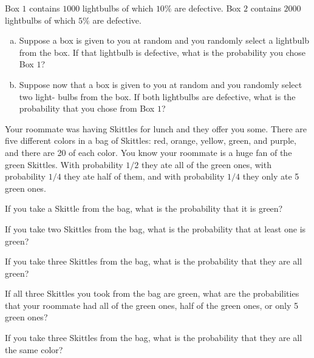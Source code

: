 
Box $1$ contains $1000$ lightbulbs of which $10 \%$ are defective. Box $2$ contains $2000$ lightbulbs of which $5 \%$ are defective.

\begin{enumerate}[(a)]


\item Suppose a box is given to you at random and you randomly select a lightbulb from the box. If that lightbulb is defective, what is the probability you chose Box $1$?

\item Suppose now that a box is given to you at random and you randomly select two light- bulbs from the box. If both lightbulbs are defective, what is the probability that you chose from Box $1$?


\end{enumerate}



 


Your roommate was having Skittles for lunch and they offer you some.
There are five different colors in a bag of Skittles: red, orange, yellow, green, and purple, and there are 20 of each color.
You know your roommate is a huge fan of the green Skittles.
With probability $1/2$ they ate all of the green ones, with probability $1/4$ they ate half of them, and with probability $1/4$ they only ate 5 green ones. 

\begin{Parts}

\Part If you take a Skittle from the bag, what is the probability that it is green? 

\Part If you take two Skittles from the bag, what is the probability that at least one is green?

\Part If you take three Skittles from the bag, what is the probability that they are all green?

\Part If all three Skittles you took from the bag are green, what are the probabilities that your roommate had all of the green ones, half of the green ones, or only 5 green ones?

\Part If you take three Skittles from the bag, what is the probability that they are all the same color?


\end{Parts}


